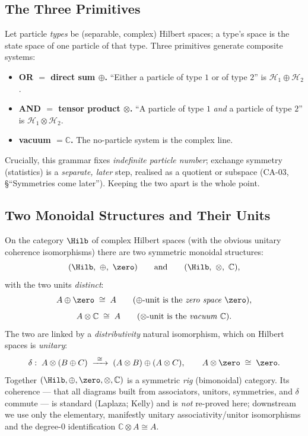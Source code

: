 \subsection{The Three Primitives}

Let particle \emph{types} be (separable, complex) Hilbert spaces; a type's space is
the state space of one particle of that type. Three primitives generate composite
systems:
\begin{itemize}
  \item \textbf{OR $=$ direct sum $\oplus$.} ``Either a particle of type $1$ or of
  type $2$'' is $\mathcal H_1 \oplus \mathcal H_2$.
  \item \textbf{AND $=$ tensor product $\otimes$.} ``A particle of type $1$
  \emph{and} a particle of type $2$'' is $\mathcal H_1 \otimes \mathcal H_2$.
  \item \textbf{vacuum $=\mathbb C$.} The no-particle system is the complex line.
\end{itemize}
Crucially, this grammar fixes \emph{indefinite particle number}; exchange symmetry
(statistics) is a \emph{separate, later} step, realised as a quotient or subspace
(CA-03, \S``Symmetries come later''). Keeping the two apart is the whole point.

\subsection{Two Monoidal Structures and Their Units}

On the category $\Hilb$ of complex Hilbert spaces (with the obvious unitary
coherence isomorphisms) there are two symmetric monoidal structures:
\[
  (\Hilb,\ \oplus,\ \zero)
  \qquad\text{and}\qquad
  (\Hilb,\ \otimes,\ \mathbb C),
\]
with the two units \emph{distinct}:
\[
  A \oplus \zero \;\cong\; A
  \qquad(\text{$\oplus$-unit is the \emph{zero space} }\zero),
\]
\[
  A \otimes \mathbb C \;\cong\; A
  \qquad(\text{$\otimes$-unit is the \emph{vacuum} }\mathbb C).
\]
The two are linked by a \emph{distributivity} natural isomorphism, which on
Hilbert spaces is \emph{unitary}:
\[
  \delta:\; A \otimes (B \oplus C)
  \;\xrightarrow{\ \cong\ }\;
  (A \otimes B) \oplus (A \otimes C),
  \qquad
  A \otimes \zero \;\cong\; \zero .
\]
Together $(\Hilb,\oplus,\zero,\otimes,\mathbb C)$ is a symmetric \emph{rig}
(bimonoidal) category. Its coherence --- that all diagrams built from associators,
unitors, symmetries, and $\delta$ commute --- is standard (Laplaza; Kelly) and is
\emph{not} re-proved here; downstream we use only the elementary, manifestly
unitary associativity/unitor isomorphisms and the degree-$0$ identification
$\mathbb C \otimes A \cong A$.

